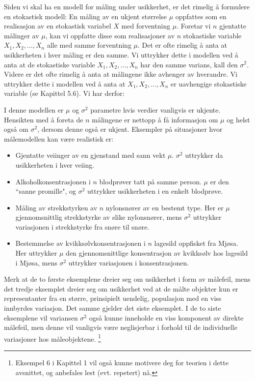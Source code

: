 Siden vi skal ha en modell for måling under usikkerhet, er
det rimelig å formulere en stokastisk modell: En måling
av en ukjent størrelse $\mu$ oppfattes som en realisasjon av
en stokastisk variabel $X$ med forventning $\mu$. Foretar vi
$n$ gjentatte målinger av $\mu$, kan vi oppfatte disse som
realisasjoner av $n$ stokastiske variable $X_1, X_2,\ldots ,X_n$
alle med samme forventning $\mu$. Det er ofte rimelig å anta at
usikkerheten i hver måling er den samme. Vi uttrykker dette i modellen
ved å anta at de stokastiske variable  $X_1, X_2,\ldots ,X_n$
har den samme varians, kall den $\sigma ^2.$ Videre er det ofte
rimelig å anta at målingene ikke avhenger av hverandre.
Vi uttrykker dette i modellen ved å anta at
$X_1,X_2,\ldots ,X_n$ er uavhengige stokastiske variable (se
Kapittel 5.6). Vi har derfor:
\begin{center}  \end{center}
I denne modellen er $\mu$ og $\sigma ^2$ parametre hvis verdier
vanligvis er ukjente. Hensikten med å foreta de $n$
målingene er nettopp å få informasjon om $\mu$ og
helst også om $\sigma ^2$, dersom denne også er ukjent.
Eksempler på situasjoner hvor målemodellen kan være
realistisk er:
\begin{itemize}
\item   Gjentatte veiinger av en gjenstand med sann vekt
     $\mu$. $\sigma^ 2$ uttrykker da usikkerheten i hver veiing.
\item   Alkoholkonsentrasjonen i $n$ blodprøver tatt på samme
     person. $\mu$ er den ``sanne promille", og $\sigma ^2$
     uttrykker usikkerheten i en enkelt blodprøve.
\item   Måling av strekkstyrken av $n$ nylonsnører av en
     bestemt type.  Her er $\mu$ gjennomsnittlig strekkstyrke av
     slike nylonsnører, mens $\sigma ^2$ uttrykker variasjonen
     i strekkstyrke fra snøre til snøre.
\item   Bestemmelse av kvikksølvkonsentrasjonen i $n$ lagesild
     oppfisket fra Mjøsa. Her uttrykker $\mu$ den
     gjennomsnittlige konsentrasjon av kvikk\-sølv hos lagesild
     i Mjøsa, mens $\sigma^ 2$ uttrykker variasjonen i
     konsentrasjonen.
\end{itemize}
Merk at de to første eksemplene dreier seg om usikkerhet i
form av målefeil, mens det tredje eksemplet dreier seg om
usikkerhet ved at de målte objekter kun er representanter fra
en større, prinsipielt uendelig, populasjon med en viss
innbyrdes variasjon. Det samme gjelder det siste eksemplet. I de
to siste eksemplene vil variansen $\sigma ^2$ også kunne
inneholde en viss komponent av direkte målefeil, men denne
vil vanligvis være neglisjerbar i forhold til de individuelle
variasjoner hos måleobjektene.
\footnote{Eksempel 6 i Kapittel 1 vil
også kunne motivere deg for teorien i dette avsnittet, og
anbefales lest (evt. repetert) nå.}

